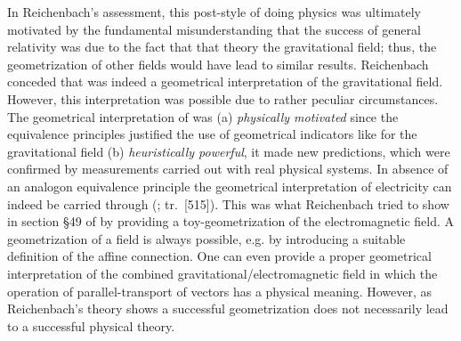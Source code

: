 \documentclass[draft]{article}
\renewcommand{\rzlp}[2]{(\cite[#1]{Reichenbach1928}; tr.\ #2)\xspace}
\renewcommand{\rzlap}[2]{(\cite[#1]{Reichenbach1928}; tr.\ [#2])\xspace}
\begin{document}


In Reichenbach's assessment, this post-\grc style of doing physics was ultimately motivated by the fundamental misunderstanding that the success of general relativity was due to the fact that that theory  the gravitational field; thus, the geometrization of other fields would have lead to similar results. Reichenbach conceded that \gr was indeed a geometrical interpretation of the gravitational field. However, this interpretation was possible due to rather peculiar circumstances. The geometrical interpretation of \rt was (a) \emph{physically motivated} since the equivalence principles justified the use of geometrical indicators like \rac for the gravitational field (b) \emph{heuristically powerful}, it made new predictions, which were confirmed by measurements carried out with real physical systems. In absence of an analogon equivalence principle the geometrical interpretation of electricity can indeed be carried through \rzlap{369}{515}. This was what Reichenbach tried to show in section \S49 of \Ap by providing a toy-geometrization of the electromagnetic field. A geometrization of a field is always possible, e.g. by introducing a suitable definition of the affine connection. One can even provide a proper geometrical interpretation of the combined gravitational/electromagnetic field in which the operation of parallel-transport of vectors has a physical meaning. However, as Reichenbach's theory shows a successful geometrization does not necessarily lead to a successful physical theory. 
\end{document}
